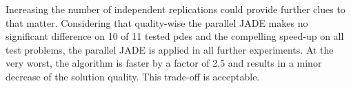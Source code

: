 \documentclass[./\jobname.tex]{subfiles}
\begin{document}
\begin{figure}[H]
	\centering
	\noindent{}
	\label{fig:pde4_ex0_ex1_boxplot}
\end{figure}

Increasing the number of independent replications could provide further clues to that matter. Considering that quality-wise the parallel JADE makes no significant difference on 10 of 11 tested \gls{pde}s and the compelling speed-up on all test problems, the parallel JADE is applied in all further experiments. At the very worst, the algorithm is faster by a factor of 2.5 and results in a minor decrease of the solution quality. This trade-off is acceptable.
\end{document}
